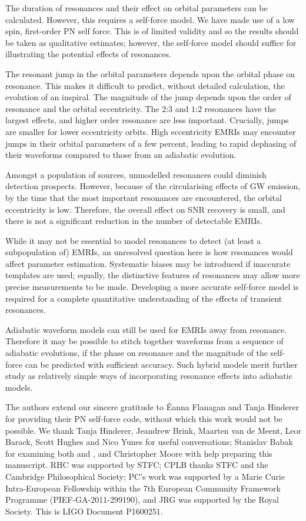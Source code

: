 \documentclass[aps,prd,amsfonts,amssymb,amsmath,nofootinbib,showpacs,superscriptaddress,twocolumn,floatfix]{revtex4-1}
\begin{document}
The duration of resonances and their effect on orbital parameters can be calculated. However, this requires a self-force model. We have made use of a low spin, first-order PN self force. This is of limited validity and so the results should be taken as qualitative estimates; however, the self-force model should suffice for illustrating the potential effects of resonances.

The resonant jump in the orbital parameters depends upon the orbital phase on resonance. This makes it difficult to predict, without detailed calculation, the evolution of an inspiral. The magnitude of the jump depends upon the order of resonance and the orbital eccentricity. The $2$:$3$ and $1$:$2$ resonances have the largest effects, and higher order resonance are less important. Crucially, jumps are smaller for lower eccentricity orbits. High eccentricity EMRIs may encounter jumps in their orbital parameters of a few percent, leading to rapid dephasing of their waveforms compared to those from an adiabatic evolution.

Amongst a population of sources, unmodelled resonances could diminish detection prospects. However, because of the circularising effects of GW emission, by the time that the most important resonances are encountered, the orbital eccentricity is low. Therefore, the overall effect on SNR recovery is small, and there is not a significant reduction in the number of detectable EMRIs.

While it may not be essential to model resonances to detect (at least a subpopulation of) EMRIs, an unresolved question here is how resonances would affect parameter estimation. Systematic biases may be introduced if inaccurate templates are used; equally, the distinctive features of resonances may allow more precise measurements to be made. Developing a more accurate self-force model is required for a complete quantitative understanding of the effects of transient resonances.

Adiabatic waveform models can still be used for EMRIs away from resonance. Therefore it may be possible to stitch together waveforms from a sequence of adiabatic evolutions, if the phase on resonance and the magnitude of the self-force can be predicted with sufficient accuracy. Such hybrid models merit further study as relatively simple ways of incorporating resonance effects into adiabatic models.


\begin{acknowledgments}
The authors extend our sincere gratitude to \'{E}anna Flanagan and Tanja Hinderer for providing their PN self-force code, without which this work would not be possible. We thank Tanja Hinderer, Jeandrew Brink, Maarten van de Meent, Leor Barack, Scott Hughes and Nico Yunes for useful conversations; Stanislav Babak for examining both \cite{BerryThesis2013} and \cite{ColeThesis2015}, and Christopher Moore with help preparing this manuscript. RHC was supported by STFC; CPLB thanks STFC and the Cambridge Philosophical Society; PC's work was supported by a Marie Curie Intra-European Fellowship within the 7th European Community Framework Programme (PIEF-GA-2011-299190), and JRG was supported by the Royal Society. This is LIGO Document P1600251. 
\end{acknowledgments}
\end{document}

